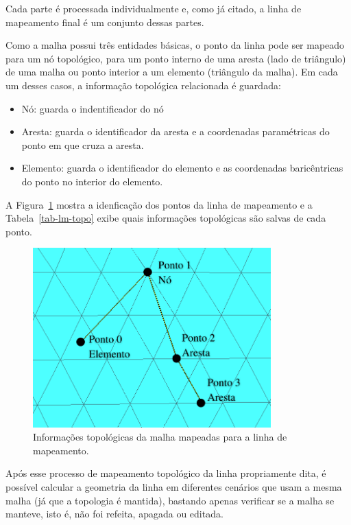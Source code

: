 Cada parte é processada individualmente e, como já citado, a linha de mapeamento final é um conjunto dessas partes.

Como a malha possui três entidades básicas, o ponto da linha pode ser mapeado para um nó topológico, para um ponto interno de uma aresta (lado de triângulo) de uma malha ou ponto interior a um elemento (triângulo da malha). Em cada um desses casos, a informação topológica relacionada é guardada:

\renewcommand{\labelitemi}{•}
\begin{itemize}
  \item Nó: guarda o indentificador do nó
  \item Aresta: guarda o identificador da aresta e a coordenadas paramétricas do ponto em que cruza a aresta.
  \item Elemento: guarda o identificador do elemento e as coordenadas baricêntricas do ponto no interior do elemento.
\end{itemize}

A Figura~\ref{fig-lm-topo} mostra a idenficação dos pontos da linha de mapeamento e a Tabela~\ref{tab-lm-topo} exibe quais informações topológicas são salvas de cada ponto.

\begin{figure} [hbt!]
  \begin{center}
    \includegraphics[width=260pt]{images/fig-lm-topo}
    \caption{Informações topológicas da malha mapeadas para a linha de mapeamento.}\label{fig-lm-topo}
  \end{center}
\end{figure}



Após esse processo de mapeamento topológico da linha propriamente dita, é possível calcular a geometria da linha em diferentes cenários que usam a mesma malha (já que a topologia é mantida), bastando apenas verificar se a malha se manteve, isto é, não foi refeita, apagada ou editada.

